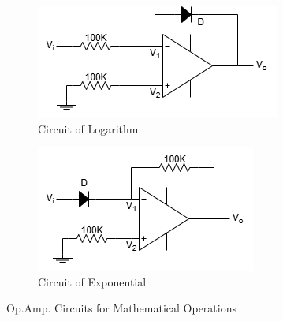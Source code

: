 \begin{figure}[H]
            \begin{subfigure}{0.4\textwidth}
                \includegraphics[width=1\linewidth]{Experiment_11/Circuit/Lab11c.drawio.png}
                \caption{Circuit of Logarithm}
                \label{cir:log}
            \end{subfigure}
            \begin{subfigure}{0.4\textwidth}
                \includegraphics[width=1\linewidth]{Experiment_11/Circuit/Lab11d.drawio.png}
                \caption{Circuit of Exponential}
                \label{cir:exp}
            \end{subfigure}
            \caption{Op.Amp. Circuits for Mathematical Operations}
        \end{figure}

